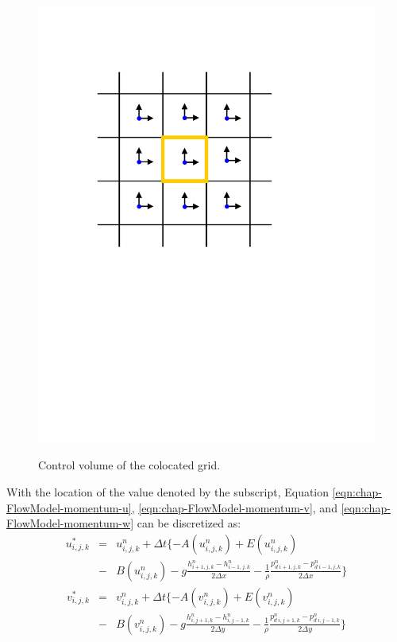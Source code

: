 \begin{figure}[htbp]
\hspace{1.8in}
\includegraphics[scale=0.50]{../figures/Grids/Colocated-CV.pdf}
\label{fig:Staggered-CV-w}
\caption{Control volume of the colocated grid.}
\end{figure}
With the location of the value denoted by the subscript, Equation \ref{eqn:chap-FlowModel-momentum-u}, \ref{eqn:chap-FlowModel-momentum-v}, and \ref{eqn:chap-FlowModel-momentum-w} can be discretized as:
\begin {eqnarray}
u_{i,j,k}^{*} &=& u_{i,j,k}^{n}+ \Delta t
\{ -A(u_{i,j,k}^n)+E(u_{i,j,k}^n) \nonumber \\
&-&B(u_{i,j,k}^n)-g\frac{h_{i+1,j,k}^n-h_{i-1,j,k}^n}{2\Delta x}
-\frac{1}{\rho}\frac{p_{d \ i+1,j,k}^n-p_{d \ i-1,j,k}^n}{ 2\Delta x}
\}
\end{eqnarray}
\begin {eqnarray}
v_{i,j,k}^{*} &=& v_{i,j,k}^{n}+ \Delta t
\{ -A(v_{i,j,k}^n)+E(v_{i,j,k}^n) \nonumber \\
&-&B(v_{i,j,k}^n)-g\frac{h_{i,j+1,k}^n-h_{i,j-1,k}^n}{2\Delta y}
-\frac{1}{\rho}\frac{p_{d \ i,j+1,k}^n-p_{d \ i,j-1,k}^n}{ 2\Delta y}
\}
\end{eqnarray}
